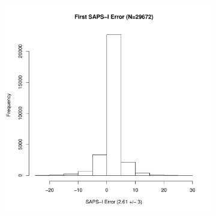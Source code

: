 \documentclass[10pt]{article}
\begin{document}
\begin{figure}
\begin{subfigure}[b]{0.5\textwidth}
          \includegraphics[width=\linewidth]{../../figure/fig_hist_sapsi_first_err.pdf}
        \end{subfigure}

\end{figure}
\end{document}
